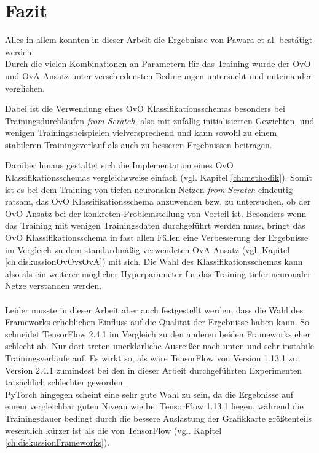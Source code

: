 \chapter{Fazit}
\label{ch:fazit}
Alles in allem konnten in dieser Arbeit die Ergebnisse von Pawara et al. \cite{pawaraPaper} bestätigt werden.\\
Durch die vielen Kombinationen an Parametern für das Training wurde der OvO und OvA Ansatz unter verschiedensten Bedingungen untersucht und miteinander verglichen.

Dabei ist die Verwendung eines OvO Klassifikationsschemas besonders bei Trainingsdurchläufen \textit{from Scratch}, also mit zufällig initialisierten Gewichten, und wenigen Trainingsbeispielen vielversprechend und kann sowohl zu einem stabileren Trainingsverlauf als auch zu besseren Ergebnissen beitragen.

Darüber hinaus gestaltet sich die Implementation eines OvO Klassifikationsschemas vergleichsweise einfach (vgl. Kapitel \ref{ch:methodik}). Somit ist es bei dem Training von tiefen neuronalen Netzen \textit{from Scratch} eindeutig ratsam, das OvO Klassifikationsschema anzuwenden bzw. zu untersuchen, ob der OvO Ansatz bei der konkreten Problemstellung von Vorteil ist. Besonders wenn das Training mit wenigen Trainingsdaten durchgeführt werden muss, bringt das OvO Klassifikationsschema in fast allen Fällen eine Verbesserung der Ergebnisse im Vergleich zu dem standardmäßig verwendeten OvA Ansatz (vgl. Kapitel \ref{ch:diskussionOvOvsOvA}) mit sich. Die Wahl des Klassifikationsschemas kann also als ein weiterer möglicher Hyperparameter für das Training tiefer neuronaler Netze verstanden werden.\\\\

Leider musste in dieser Arbeit aber auch festgestellt werden, dass die Wahl des Frameworks erheblichen Einfluss auf die Qualität der Ergebnisse haben kann. So schneidet TensorFlow 2.4.1 \cite{tensorflow} im Vergleich zu den anderen beiden Frameworks eher schlecht ab. Nur dort treten unerklärliche Ausreißer nach unten und sehr instabile Trainingsverläufe auf. Es wirkt so, als wäre TensorFlow \cite{tensorflow} von Version 1.13.1 zu Version 2.4.1 zumindest bei den in dieser Arbeit durchgeführten Experimenten tatsächlich schlechter geworden.\\
PyTorch \cite{pytorch} hingegen scheint eine sehr gute Wahl zu sein, da die Ergebnisse auf einem vergleichbar guten Niveau wie bei TensorFlow 1.13.1 \cite{tensorflow} liegen, während die Trainingsdauer bedingt durch die bessere Auslastung der Grafikkarte größtenteils wesentlich kürzer ist als die von TensorFlow \cite{tensorflow} (vgl. Kapitel \ref{ch:diskussionFrameworks}).\\\\

